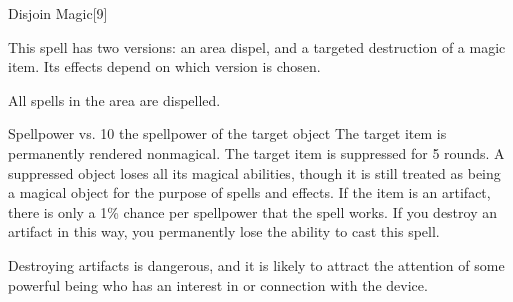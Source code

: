 \begin{spellsection}{Disjoin Magic}[9]
    \begin{spellheader}
    \end{spellheader}
    \begin{spellcontent}
        \begin{spelltargetinginfo}
            \spellspecial This spell has two versions: an area dispel, and a targeted destruction of a magic item. Its effects depend on which version is chosen.
        \end{spelltargetinginfo}
    \end{spellcontent}
    \begin{spellsubcontent}
        \begin{spelltargetinginfo}
        \end{spelltargetinginfo}
        \begin{spelleffects}
            \spelleffect All spells in the area are dispelled.
        \end{spelleffects}
    \end{spellsubcontent}
    \begin{spellsubcontent}
        \begin{spelltargetinginfo}
        \end{spelltargetinginfo}
        \begin{spelleffects}
            \begin{spellattack}{Spellpower vs. 10 \add the spellpower of the target object}
                \spellsuccess The target item is permanently rendered nonmagical.
                \spellfailure The target item is suppressed for 5 rounds. A suppressed object loses all its magical abilities, though it is still treated as being a magical object for the purpose of spells and effects.
                \spellspecial If the item is an artifact, there is only a 1\% chance per spellpower that the spell works. If you destroy an artifact in this way, you permanently lose the ability to cast this spell.
            \end{spellattack}
        \end{spelleffects}
    \end{spellsubcontent}
    \begin{spellfooter}
        \spellnotes Destroying artifacts is dangerous, and it is likely to attract the attention of some powerful being who has an interest in or connection with the device.
        \miscastyou
    \end{spellfooter}
\end{spellsection}

